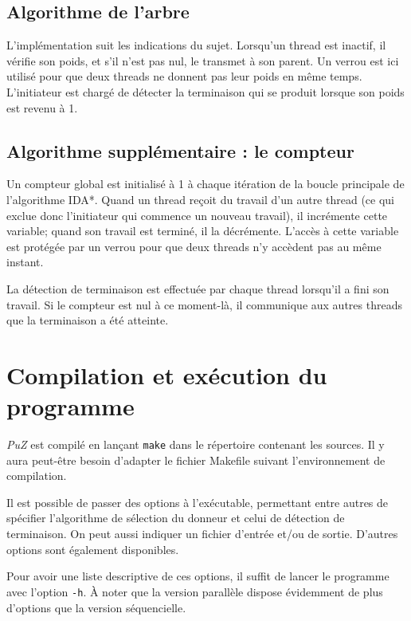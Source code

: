 \documentclass[a4paper,11pt]{report}
\newcommand{\ensp}[1]{\selectlanguage{english}#1\selectlanguage{french}}
\newcommand{\file}[1]{\ensp{\textsf{#1}}}
\newcommand{\puz}{\emph{PuZ}}
\begin{document}
\subsection{Algorithme de l'arbre}

L'implémentation suit les indications du sujet. Lorsqu'un thread est inactif,
il vérifie son poids, et s'il n'est pas nul, le transmet à son parent. Un
verrou est ici utilisé pour que deux threads ne donnent pas leur poids en
même temps. L'initiateur est chargé de détecter la terminaison qui se produit
lorsque son poids est revenu à 1.

\subsection{Algorithme supplémentaire : le compteur}

Un compteur global est initialisé à 1 à chaque itération de la boucle
principale de l'algorithme IDA*. Quand un thread reçoit du travail d'un
autre thread (ce qui exclue donc l'initiateur qui commence un nouveau
travail), il incrémente cette variable; quand son travail est terminé, il la
décrémente. L'accès à cette variable est protégée par un verrou pour que deux
threads n'y accèdent pas au même instant.

La détection de terminaison est effectuée par chaque thread lorsqu'il a fini
son travail. Si le compteur est nul à ce moment-là, il communique aux autres
threads que la terminaison a été atteinte.

\section{Compilation et exécution du programme}

\puz{} est compilé en lançant \verb!make! dans le répertoire contenant les
sources. Il y aura peut-être besoin d'adapter le fichier \file{Makefile}
suivant l'environnement de compilation.

Il est possible de passer des options à l'exécutable, permettant entre autres
de spécifier l'algorithme de sélection du donneur et celui de détection de
terminaison. On peut aussi indiquer un fichier d'entrée et/ou de sortie.
D'autres options sont également disponibles.

Pour avoir une liste descriptive de ces options, il suffit de lancer le
programme avec l'option \og\verb!-h!\fg. À noter que la version parallèle
dispose évidemment de plus d'options que la version séquencielle.
\end{document}
